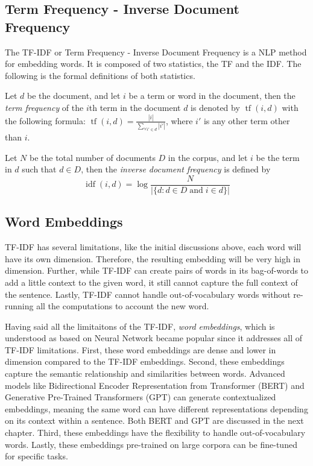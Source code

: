\subsection{Term Frequency - Inverse Document Frequency}\label{sec:tf-df}
The TF-IDF or Term Frequency - Inverse Document Frequency is a NLP method for embedding words. It is composed of two statistics, the TF and the IDF. The following is the formal definitions of both statistics.
\begin{defnx}
Let $d$ be the document, and let $i$ be a term or word in the document, then the \textit{term frequency} of the $i$th term in the document $d$ is denoted by $\operatorname{tf}(i,d)$ with the following formula: $\operatorname{tf}(i,d)=\displaystyle\frac{|i|}{\sum_{\forall i'\in d}|i'|}$, where $i'$ is any other term other than $i$.
\end{defnx}
\begin{defnx}
Let $N$ be the total number of documents $D$ in the corpus, and let $i$ be the term in $d$ such that $d\in D$, then the \textit{inverse document frequency} is defined by
\begin{equation}
    \operatorname{idf}(i,d)=\log\frac{N}{|\{d:d\in D\;\text{and}\;i\in d\}|}
\end{equation}
\end{defnx}
\subsection{Word Embeddings}\label{sec:word-embeddings}
TF-IDF has several limitations, like the initial discussions above, each word will have its own dimension. Therefore, the resulting embedding will be very high in dimension. Further, while TF-IDF can create pairs of words in its bag-of-words to add a little context to the given word, it still cannot capture the full context of the sentence. Lastly, TF-IDF cannot handle out-of-vocabulary words without re-running all the computations to account the new word.

Having said all the limitaitons of the TF-IDF, \textit{word embeddings}, which is understood as based on Neural Network became popular since it addresses all of TF-IDF limitations. First, these word embeddings are dense and lower in dimension compared to the TF-IDF embeddings. Second, these embeddings capture the semantic relationship and similarities between words. Advanced models like Bidirectional Encoder Representation from Transformer (BERT) and Generative Pre-Trained Transformers (GPT) can generate contextualized embeddings, meaning the same word can have different representations depending on its context within a sentence. Both BERT and GPT are discussed in the next chapter. Third, these embeddings have the flexibility to handle out-of-vocabulary words. Lastly, these embeddings pre-trained on large corpora can be fine-tuned for specific tasks.

